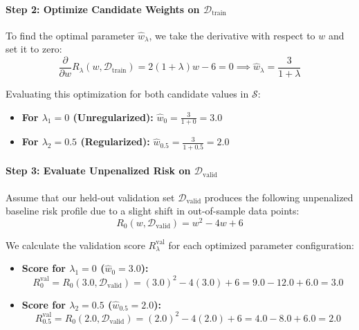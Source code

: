 \documentclass{article}
\begin{document}
\paragraph{Step 2: Optimize Candidate Weights on $\mathcal{D}_{\text{train}}$}
To find the optimal parameter $\hat{w}_\lambda$, we take the derivative with respect to $w$ and set it to zero:
\begin{equation}
\frac{\partial}{\partial w} R_\lambda(w, \mathcal{D}_{\text{train}}) = 2(1 + \lambda)w - 6 = 0 \implies \hat{w}_\lambda = \frac{3}{1 + \lambda}
\end{equation}

Evaluating this optimization for both candidate values in $\mathcal{S}$:
\begin{itemize}
    \item \textbf{For $\lambda_1 = 0$ (Unregularized):} $\hat{w}_0 = \frac{3}{1 + 0} = 3.0$
    \item \textbf{For $\lambda_2 = 0.5$ (Regularized):} $\hat{w}_{0.5} = \frac{3}{1 + 0.5} = 2.0$
\end{itemize}

\paragraph{Step 3: Evaluate Unpenalized Risk on $\mathcal{D}_{\text{valid}}$}
Assume that our held-out validation set $\mathcal{D}_{\text{valid}}$ produces the following unpenalized baseline risk profile due to a slight shift in out-of-sample data points:
\begin{equation}
R_0(w, \mathcal{D}_{\text{valid}}) = w^2 - 4w + 6
\end{equation}

We calculate the validation score $R^{\text{val}}_\lambda$ for each optimized parameter configuration:
\begin{itemize}
    \item \textbf{Score for $\lambda_1 = 0$ ($\hat{w}_0 = 3.0$):}
    \begin{equation}
    R^{\text{val}}_0 = R_0(3.0, \mathcal{D}_{\text{valid}}) = (3.0)^2 - 4(3.0) + 6 = 9.0 - 12.0 + 6.0 = 3.0
    \end{equation}
    \item \textbf{Score for $\lambda_2 = 0.5$ ($\hat{w}_{0.5} = 2.0$):}
    \begin{equation}
    R^{\text{val}}_{0.5} = R_0(2.0, \mathcal{D}_{\text{valid}}) = (2.0)^2 - 4(2.0) + 6 = 4.0 - 8.0 + 6.0 = 2.0
    \end{equation}
\end{itemize}
\end{document}
